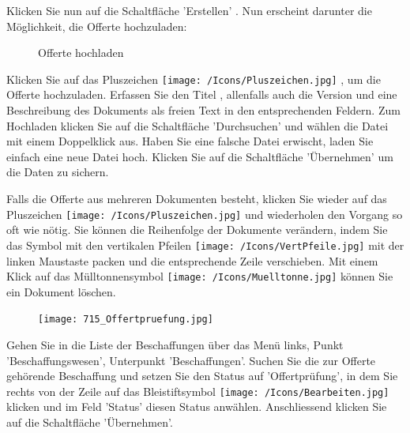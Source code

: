 Klicken Sie nun auf die Schaltfläche 'Erstellen' . Nun erscheint darunter die Möglichkeit, die Offerte
hochzuladen:

\begin{figure}[H]
\caption{Offerte hochladen}
\end{figure}

Klicken Sie auf das Pluszeichen \texttt{[image: /Icons/Pluszeichen.jpg]} , um die Offerte hochzuladen. Erfassen Sie den Titel , allenfalls auch die Version  und eine Beschreibung  des Dokuments als freien Text in den entsprechenden Feldern. Zum Hochladen klicken Sie auf die Schaltfläche 'Durchsuchen'  und wählen die Datei mit einem Doppelklick aus. Haben Sie eine falsche Datei erwischt, laden Sie einfach eine neue Datei hoch. Klicken Sie auf die Schaltfläche 'Übernehmen'  um die Daten zu sichern.

\vspace{\baselineskip}

Falls die Offerte aus mehreren Dokumenten besteht, klicken Sie wieder auf das Pluszeichen \texttt{[image: /Icons/Pluszeichen.jpg]}  und wiederholen den Vorgang so oft wie nötig. Sie können die Reihenfolge der Dokumente verändern, indem Sie das Symbol mit den vertikalen Pfeilen \texttt{[image: /Icons/VertPfeile.jpg]}  mit der linken Maustaste packen und die entsprechende Zeile verschieben. Mit einem Klick auf das Mülltonnensymbol \texttt{[image: /Icons/Muelltonne.jpg]}  können Sie ein Dokument löschen.

\vspace{\baselineskip}

\begin{figure}
\vspace{-15pt}
\texttt{[image: 715\_Offertpruefung.jpg]}
\end{figure}
Gehen Sie in die Liste der Beschaffungen über das Menü links, Punkt 'Beschaffungswesen', Unterpunkt 'Beschaffungen'. Suchen Sie die zur Offerte gehörende Beschaffung und setzen Sie den Status auf 'Offertprüfung', in dem Sie rechts von der Zeile auf das Bleistiftsymbol \texttt{[image: /Icons/Bearbeiten.jpg]} klicken und im Feld 'Status' diesen Status anwählen. Anschliessend klicken Sie auf die Schaltfläche 'Übernehmen'.

\vspace{\baselineskip}

